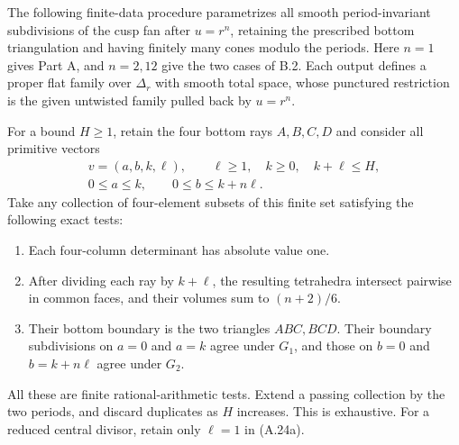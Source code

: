 \begin{theorem}\label{push:src:A.2.4}\label{push:A24}

The following finite-data procedure parametrizes all smooth
period-invariant subdivisions of the cusp fan after
$u=r^n$, retaining the prescribed bottom triangulation and
having finitely many cones modulo the periods. Here $n=1$
gives Part A, and $n=2,12$ give the two cases of B.2.
Each output defines a proper flat family over $\Delta_r$
with smooth total space, whose punctured restriction is the
given untwisted family pulled back by $u=r^n$.

For a bound $H\geq1$, retain the four bottom rays
$A,B,C,D$ and consider all primitive vectors
\[
 \begin{gathered}
 v=(a,b,k,\ell),\qquad
 \ell\geq1,\quad k\geq0,\quad k+\ell\leq H,\\
 0\leq a\leq k,\qquad0\leq b\leq k+n\ell.
 \end{gathered}
 \tag{A.24a}
\]
Take any collection of four-element subsets of this finite
set satisfying the following exact tests:
\begin{enumerate}
\item Each four-column determinant has absolute value one.
\item After dividing each ray by $k+\ell$, the resulting
tetrahedra intersect pairwise in common faces, and their
volumes sum to $(n+2)/6$.
\item Their bottom boundary is the two triangles $ABC,BCD$.
Their boundary subdivisions on $a=0$ and $a=k$ agree under
$G_1$, and those on $b=0$ and $b=k+n\ell$ agree under $G_2$.
\end{enumerate}
All these are finite rational-arithmetic tests. Extend a
passing collection by the two periods, and discard duplicates
as $H$ increases. This is exhaustive. For a reduced central
divisor, retain only $\ell=1$ in (A.24a).


\end{theorem}
